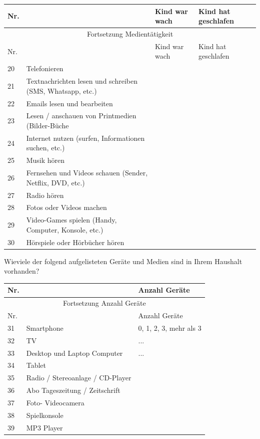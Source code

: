 \begin{flushleft}
\begin{longtable}[c]{ |p{1em}|p{20em}|p{5em}|p{5em}|}

  \hline
  Nr. &  & Kind war wach & Kind hat geschlafen \\
  \hline
  \endfirsthead
 
  \hline
  \multicolumn{4}{|c|}{ Fortsetzung Medientätigkeit}\\
  \hline
   Nr. &  & Kind war wach & Kind hat geschlafen \\
  \hline
  \endhead
 
  \hline
  \endfoot
 
  \hline\hline
  \endlastfoot
  
  
  20 & Telefonieren &  &  \\
  21 & Textnachrichten lesen und schreiben (SMS, Whatsapp, etc.)  &  &  \\
  22 & Emails lesen und bearbeiten &  &  \\
  23 & Lesen / anschauen von Printmedien (Bilder-Büche &  &  \\
  24 & Internet nutzen (surfen, Informationen suchen, etc.) &  &  \\
  25 & Musik hören &  &  \\
  26 & Fernsehen und Videos schauen (Sender, Netflix, DVD, etc.) &  &  \\
  27 & Radio hören &  &  \\
  28 & Fotos oder Videos machen &  &  \\
  29 & Video-Games spielen (Handy, Computer, Konsole, etc.) &  &  \\
  30 & Hörspiele oder Hörbücher hören &  &  \\
\end{longtable}

Wieviele der folgend aufgelisteten Geräte und Medien sind in Ihrem Haushalt vorhanden?

\begin{longtable}[c]{ |p{1em}|p{18em}|p{10em}|}
 
  \hline
  Nr. & & Anzahl Geräte \\
  \hline
  \endfirsthead
 
  \hline
  \multicolumn{3}{|c|}{ Fortsetzung Anzahl Geräte}\\
  \hline
   Nr. &  & Anzahl Geräte \\
  \hline
  \endhead
 
  \hline
  \endfoot
 
  \hline\hline
  \endlastfoot
  
  
  31 & Smartphone &  0, 1, 2, 3, mehr als 3 \\
  32 & TV & ... \\
  33 & Desktop und Laptop Computer & ... \\
  34 & Tablet &  \\
  35 & Radio / Stereoanlage / CD-Player &  \\
  36 & Abo Tageszeitung / Zeitschrift &  \\
  37 & Foto- Videocamera &  \\
  38 & Spielkonsole &  \\
  39 & MP3 Player &  \\
\end{longtable}


\end{flushleft}
